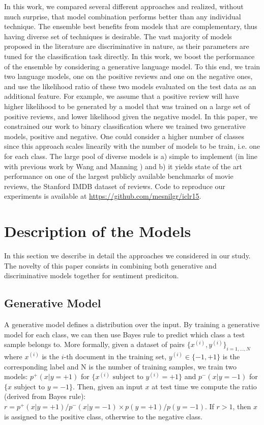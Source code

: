 \documentclass{article} %
\begin{document}
In this work, we compared several different approaches and realized, without
much surprise, that model combination performs better than any individual
technique. The ensemble best benefits from models that are complementary, thus
having diverse set of techniques is desirable. The vast majority of models
proposed in the literature are discriminative in nature, as their parameters
are tuned for the classification task directly. In this work, we boost the
performance of the ensemble by considering a generative language model. To this
end, we train two language models, one on the positive reviews and one on the
negative ones, and use the likelihood ratio of these two models evaluated on
the test data as an additional feature. For example, we assume that a positive
review will have higher likelihood to be generated by a model that was trained
on a large set of positive reviews, and lower likelihood given the negative
model. In this paper, we constrained our work to binary classification where we
trained two generative models, positive and negative. One could consider a
higher number of classes since this approach scales linearily with the number
of models to be train, i.e. one for each class.  
The large pool of diverse
models is a) simple to implement (in line with previous work by Wang and
Manning \citep{Wang2012}) and b) it yields state of the art performance on
one of the largest publicly available benchmarks of movie reviews, the Stanford
IMDB dataset of reviews. Code to reproduce our experiments is available at
\url{https://github.com/mesnilgr/iclr15}.

\section{Description of the Models}

In this section we describe in detail the approaches we considered in our
study. The novelty of this paper consists in combining both generative and
discriminative models together for sentiment prediciton. 

\subsection{Generative Model}

A generative model defines a distribution over the input. By training a
generative model for each class, we can then use Bayes rule to predict which
class a test sample belongs to. More formally, given a dataset of pairs $\{x^{(i)},
y^{(i)}\}_{i=1,\dots, N}$ where $x^{(i)}$ is the $i$-th document in the training set, $y^{(i)} \in
\{-1,+1\}$ is the corresponding label and N is the number of training samples, we
train two models: $p^{+}(x | y = +1)$ for $\{x^{(i)} \textrm{~subject to~} y^{(i)} = +1\}$ and $p^{-}(x | y = -1)$ for
$\{x \textrm{~subject to~} y = -1\}$. Then, given an input $x$ at test time we compute the ratio
(derived from Bayes rule): $r =  p^{+}(x | y = +1) / p^{-}(x | y = -1) \times p(y = +1) /
p(y = -1)$. If $r > 1$, then $x$ is assigned to the positive class, otherwise to the
negative class.
\end{document}
